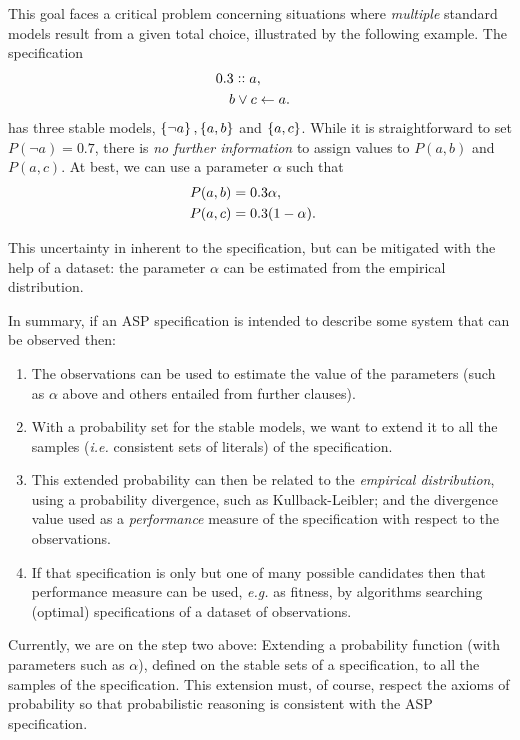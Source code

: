 \documentclass[a4paper]{article}
\begin{document}
This goal faces a critical problem concerning situations where \textit{multiple} standard models result from a given total choice\cite{cozman2020joy}, illustrated by the following example. The specification 
$$
\begin{aligned}
    0.3::a&,\cr
    b \vee c& \leftarrow a.
\end{aligned}
$$
has three stable models, $\set{\neg a}, \set{a, b}$ and $\set{a, c}$. While it is straightforward to set $P(\neg a)=0.7$, there is \textit{no further information} to assign values to $P(a,b)$ and $P(a,c)$. At best, we can use a parameter $\alpha$ such that
$$
\begin{aligned}
P(a,b) &= 0.3 \alpha,\cr
P(a,c) &= 0.3 (1 - \alpha).
\end{aligned}
$$

This uncertainty in inherent to the specification, but can be mitigated with the help of a dataset: the parameter $\alpha$ can be estimated from the empirical distribution.

In summary, if an ASP specification is intended to describe some system that can be observed then:

\begin{enumerate}
    \item The observations can be used to estimate the value of the parameters (such as $\alpha$ above and others entailed from further clauses).
    \item With a probability set for the stable models, we want to extend it to all the samples (\textit{i.e.} consistent sets of literals) of the specification. 
    \item This extended probability can then be related to the \textit{empirical distribution}, using a probability divergence, such as Kullback-Leibler; and the divergence value used as a \textit{performance} measure of the specification with respect to the observations.
    \item If that specification is only but one of many possible candidates then that performance measure can be used, \textit{e.g.} as fitness, by algorithms searching (optimal) specifications of a dataset of observations.
\end{enumerate}

Currently, we are on the step two above: Extending a probability function (with parameters such as $\alpha$), defined on the stable sets of a specification, to all the samples of the specification. This extension must, of course, respect the axioms of probability so that probabilistic reasoning is consistent with the ASP specification. 
\end{document}
